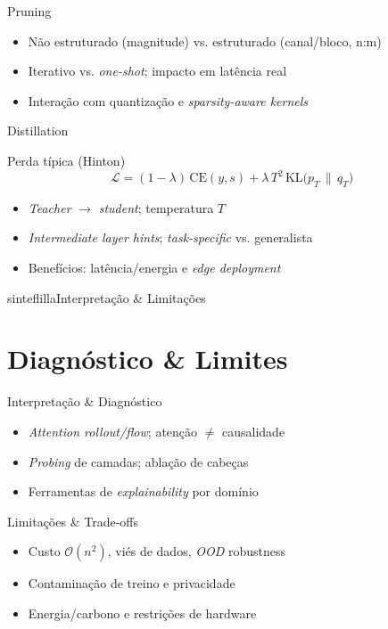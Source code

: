 \documentclass{beamer}
\begin{document}
\begin{frame}{Pruning}
\begin{itemize}[<+->]
  \item Não estruturado (magnitude) vs. estruturado (canal/bloco, n:m)
  \item Iterativo vs. \textit{one-shot}; impacto em latência real
  \item Interação com quantização e \textit{sparsity-aware kernels}
\end{itemize}
\end{frame}

\begin{frame}{Distillation}
\begin{block}{Perda típica (Hinton)}
\small
\[
\mathcal{L}=(1-\lambda)\,\mathrm{CE}(y,s)+\lambda\,T^2\,\mathrm{KL}\!\big(p_T \,\|\, q_T\big)
\]
\end{block}
\begin{itemize}[<+->]
  \item \textit{Teacher} $\rightarrow$ \textit{student}; temperatura $T$
  \item \textit{Intermediate layer hints}; \textit{task-specific} vs. generalista
  \item Benefícios: latência/energia e \textit{edge deployment}
\end{itemize}
\end{frame}

\begin{chapter}{sinteflilla}{Interpretação \& Limitações}\end{chapter}

\section{Diagnóstico \& Limites}
\begin{frame}{Interpretação \& Diagnóstico}
\begin{itemize}[<+->]
  \item \textit{Attention rollout/flow}; atenção $\neq$ causalidade
  \item \textit{Probing} de camadas; ablação de cabeças
  \item Ferramentas de \textit{explainability} por domínio
\end{itemize}
\end{frame}

\begin{frame}{Limitações \& Trade-offs}
\begin{itemize}[<+->]
  \item Custo $\mathcal{O}(n^2)$, viés de dados, \textit{OOD} robustness
  \item Contaminação de treino e privacidade
  \item Energia/carbono e restrições de hardware
\end{itemize}
\end{frame}
\end{document}
